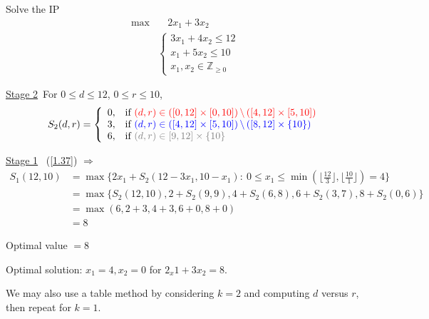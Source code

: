 \begin{example}
    Solve the IP
    \begin{align}
        \max & \quad 2x_1+3x_2 \nonumber \\
        & \left\lbrace\begin{array}{l}
            3x_1+4x_2\leqslant 12   \\
            x_1+5x_2\leqslant 10\\
            x_1, x_2\in\mathbb{Z}_{\geqslant 0}
        \end{array} \right.
    \end{align}
\end{example}
\begin{solution}
    \uline{Stage 2}\ For $0\leqslant d\leqslant 12$, $0\leqslant r\leqslant 10$, 
    \begin{align*}
        S_2(d, r) = \left\lbrace\begin{array}{ll}
            0, & \text{if} \ {\color{red}(d, r) \in\left([0, 12]\times[0, 10]\right) \backslash \left([4, 12]\times[5, 10]\right)}  \\
            3, &\text{if} \ {\color{blue}(d, r) \in \left([4, 12]\times[5, 10] \right)\backslash\left([8, 12]\times\{10\} \right)} \\
            6, &\text{if} \ {\color{gray}(d, r) \in [9, 12]\times \{10\}}
        \end{array} \right.
    \end{align*}

    \uline{Stage 1} \ (\ref{1.37}) $\Rightarrow$
    \begin{align*}
        S_1(12, 10) &= \max\{2x_1+S_2(12-3x_1, 10-x_1):\ 0\leqslant x_1\leqslant \min\left(\lfloor\frac{12}{3}\rfloor, \lfloor\frac{10}{1}\rfloor\right) = 4\} \\
        & = \max\{ S_2(12, 10), 2+S_2(9, 9), 4+S_2(6, 8), 6+S_2(3, 7), 8+S_2(0, 6) \}\\
        & = \max(6, 2+3, 4+3, 6+0, 8+0) \\
        & = 8
    \end{align*}

   Optimal value $ = 8$

   Optimal solution: $x_1 = 4, x_2 = 0$ for $2_x1+3x_2 = 8$.

   We may also use a table method by considering $k=2$ and computing $d$ versus $r$, then repeat for $k=1$.
\end{solution}

